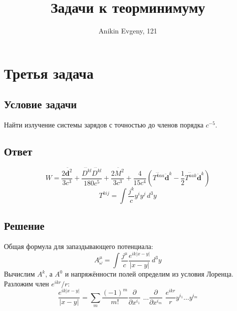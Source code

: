 \documentclass{article}
\title{Задачи к теорминимуму}
\author{Anikin Evgeny, 121}
\begin{document}
\maketitle
\section{Третья задача}
\subsection{Условие задачи}
Найти излучение системы зарядов с точностью до членов порядка $c^{-5}$.
\subsection{Ответ}
\begin{equation}
	W = \frac{2\ddot{\mathbf{d}^2}}{3c^3} + 
			\frac{\dddot{D^{kl}}\dddot{D^{kl}}}{180c^5} + \frac{2\ddot{M^2}}{3c^3} + 
			\frac{4}{15c^4} \left( \dddot{T^{kaa}} \ddot{\mathbf{d}}^k -
						\frac{1}{2} \dddot{T^{aak}}\ddot{\mathbf{d}}^k \right )
\end{equation}
\begin{equation}
	T^{kij} = \int \frac{j^k}{c}y^iy^j \, d^3 y
\end{equation}
\subsection{Решение}
Общая формула для запаздывающего потенциала:
\begin{equation}
	A_\omega^{\mu} = \int\frac{j^{\mu}}{c} \frac{e^{ik|x - y|}}{|x - y|}\, d^3 y
\end{equation}
Вычислим $A^k$, а $A^0$ и напряжённости полей определим из условия Лоренца.
Разложим член $e^{ikr}/r$:
\begin{equation}
	\frac{e^{ik|x - y|}}{|x - y|} = \sum_m \frac{(-1)^m}{m!}
			\frac{\partial}{\partial x^{i_1}\!\!\!\!\!}\,\, \dots 
				\frac{\partial}{\partial x^{i_m}\!\!\!\!\!}\,\,
				\frac{e^{ikr}}{r}
					y^{i_1} \dots y^{i_m}
\end{equation}
\end{document}
